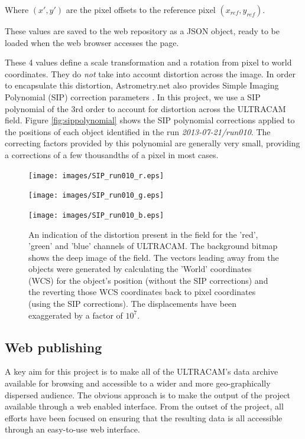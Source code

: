 Where $(x', y')$ are the pixel offsets to the reference pixel $(x_{ref}, y_{ref})$.

These values are saved to the web repository as a JSON object, ready to be loaded when the web browser accesses the page. 

These 4 values define a scale transformation and a rotation from pixel to world coordinates. They do \emph{not} take into account distortion across the image. In order to encapsulate this distortion, Astrometry.net also provides Simple Imaging Polynomial (SIP) correction parameters \cite{sippolynomial}. In this project, we use a SIP polynomial of the 3rd order to account for distortion across the ULTRACAM field. Figure \ref{fig:sippolynomial} shows the SIP polynomial corrections applied to the positions of each object identified in the run \emph{2013-07-21/run010}. The correcting factors provided by this polynomial are generally very small, providing a corrections of a few thousandths of a pixel in most cases. 

\begin{figure}
  \centering
  \texttt{[image: images/SIP\_run010\_r.eps]}
  
  \texttt{[image: images/SIP\_run010\_g.eps]}
  
  \texttt{[image: images/SIP\_run010\_b.eps]}

\caption{An indication of the distortion present in the field for the 'red', 'green' and 'blue' channels of ULTRACAM. The background bitmap shows the deep image of the field. The vectors leading away from the objects were generated by calculating the 'World' coordinates (WCS) for the object's position (without the SIP corrections) and the reverting those WCS coordinates back to pixel coordinates (using the SIP corrections). The displacements have been exaggerated by a factor of $10^7$.}
\label{fig:sipfit}
\end{figure}


\subsection{Web publishing}
A key aim for this project is to make all of the ULTRACAM's data archive available for browsing and accessible to a wider and more geo-graphically dispersed audience. The obvious approach is to make the output of the project available through a web enabled interface. From the outset of the project, all efforts have been focused on ensuring that the resulting data is all accessible through an easy-to-use web interface. 

